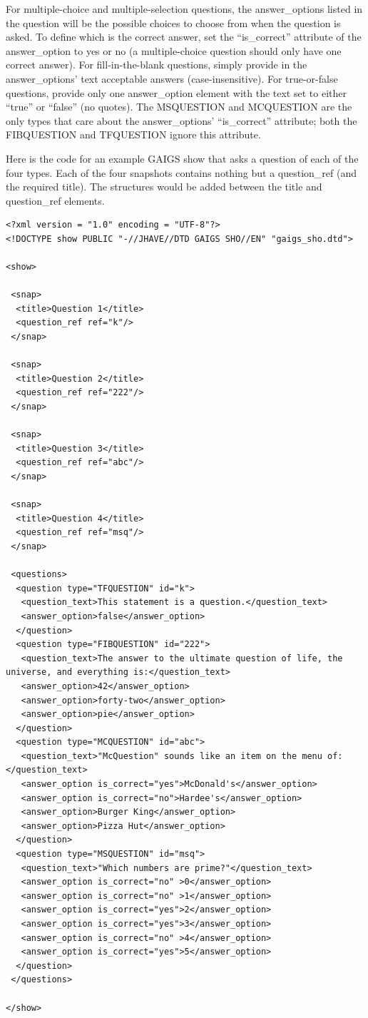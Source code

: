 \documentclass[12pt]{article}
\begin{document}
For multiple-choice and multiple-selection questions, the
answer\_options listed in the question will be the possible choices to
choose from when the question is asked. To define which is the correct
answer, set the ``is\_correct'' attribute of the answer\_option to yes
or no (a multiple-choice question should only have one correct
answer). For fill-in-the-blank questions, simply provide in the
answer\_options' text acceptable answers (case-insensitive). For
true-or-false questions, provide only one answer\_option element with
the text set to either ``true'' or ``false'' (no quotes). The
MSQUESTION and MCQUESTION are the only types that care about the
answer\_options' ``is\_correct'' attribute; both the FIBQUESTION and
TFQUESTION ignore this attribute.

Here is the code for an example GAIGS show that asks a question of
each of the four types. Each of the four snapshots contains nothing
but a question\_ref (and the required title). The structures would be
added between the title and question\_ref elements.

\footnotesize \begin{verbatim}
<?xml version = "1.0" encoding = "UTF-8"?>
<!DOCTYPE show PUBLIC "-//JHAVE//DTD GAIGS SHO//EN" "gaigs_sho.dtd">

<show>

 <snap>
  <title>Question 1</title>
  <question_ref ref="k"/>
 </snap>

 <snap>
  <title>Question 2</title>
  <question_ref ref="222"/>
 </snap>

 <snap>
  <title>Question 3</title>
  <question_ref ref="abc"/>
 </snap>

 <snap>
  <title>Question 4</title>
  <question_ref ref="msq"/>
 </snap>

 <questions>
  <question type="TFQUESTION" id="k">
   <question_text>This statement is a question.</question_text>
   <answer_option>false</answer_option>
  </question>
  <question type="FIBQUESTION" id="222">
   <question_text>The answer to the ultimate question of life, the universe, and everything is:</question_text>
   <answer_option>42</answer_option>
   <answer_option>forty-two</answer_option>
   <answer_option>pie</answer_option>
  </question>
  <question type="MCQUESTION" id="abc">
   <question_text>"McQuestion" sounds like an item on the menu of:</question_text>
   <answer_option is_correct="yes">McDonald's</answer_option>
   <answer_option is_correct="no">Hardee's</answer_option>
   <answer_option>Burger King</answer_option>
   <answer_option>Pizza Hut</answer_option>
  </question>
  <question type="MSQUESTION" id="msq">
   <question_text>"Which numbers are prime?"</question_text>
   <answer_option is_correct="no" >0</answer_option>
   <answer_option is_correct="no" >1</answer_option>
   <answer_option is_correct="yes">2</answer_option>
   <answer_option is_correct="yes">3</answer_option>
   <answer_option is_correct="no" >4</answer_option>
   <answer_option is_correct="yes">5</answer_option>
  </question>
 </questions>

</show>
\end{verbatim} \normalsize
\end{document}
